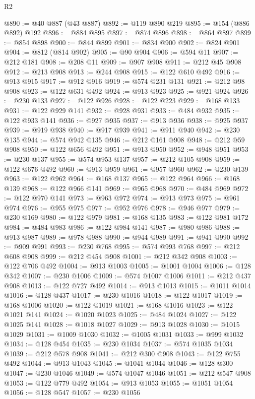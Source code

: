 \begin{lexlean}{R2}
\begin{coremodule}
@890 := @40 @887 (@43 @887)
@892 := @119 @890 @219
@895 := @154 (@886 @892) @192
@896 := @884 @895
@897 := @874 @896
@898 := @864 @897
@899 := @854 @898
@900 := @844 @899
@901 := @834 @900
@902 := @824 @901
@904 := @812 (@814 @902)
@905 := @90 @904
@906 := @594 @11
@907 := @212 @181
@908 := @208 @11
@909 := @907 @908
@911 := @212 @45 @908
@912 := @213 @908
@913 := @244 @908
@915 := @122 @610 @492
@916 := @913 @915
@917 := @912 @916
@919 := @574 @231 @131
@921 := @212 @98 @908
@923 := @122 @631 @492
@924 := @913 @923
@925 := @921 @924
@926 := @230 @133
@927 := @122 @926
@928 := @122 @223
@929 := @168 @133
@931 := @122 @929 @141
@932 := @928 @931
@933 := @484 @932
@935 := @122 @933 @141
@936 := @927 @935
@937 := @913 @936
@938 := @925 @937
@939 := @919 @938
@940 := @917 @939
@941 := @911 @940
@942 := @230 @135
@944 := @574 @942 @135
@946 := @212 @161 @908
@948 := @212 @59 @908
@950 := @122 @656 @492
@951 := @913 @950
@952 := @948 @951
@953 := @230 @137
@955 := @574 @953 @137
@957 := @212 @105 @908
@959 := @122 @676 @492
@960 := @913 @959
@961 := @957 @960
@962 := @230 @139
@963 := @122 @962
@964 := @168 @137
@965 := @122 @964
@966 := @168 @139
@968 := @122 @966 @141
@969 := @965 @968
@970 := @484 @969
@972 := @122 @970 @141
@973 := @963 @972
@974 := @913 @973
@975 := @961 @974
@976 := @955 @975
@977 := @952 @976
@978 := @946 @977
@979 := @230 @169
@980 := @122 @979
@981 := @168 @135
@983 := @122 @981 @172
@984 := @484 @983
@986 := @122 @984 @141
@987 := @980 @986
@988 := @913 @987
@989 := @978 @988
@990 := @944 @989
@991 := @941 @990
@992 := @909 @991
@993 := @230 @768
@995 := @574 @993 @768
@997 := @212 @608 @908
@999 := @212 @454 @908
@1001 := @212 @342 @908
@1003 := @122 @706 @492
@1004 := @913 @1003
@1005 := @1001 @1004
@1006 := @128 @342
@1007 := @230 @1006
@1009 := @574 @1007 @1006
@1011 := @212 @437 @908
@1013 := @122 @727 @492
@1014 := @913 @1013
@1015 := @1011 @1014
@1016 := @128 @437
@1017 := @230 @1016
@1018 := @122 @1017
@1019 := @168 @1006
@1020 := @122 @1019
@1021 := @168 @1016
@1023 := @122 @1021 @141
@1024 := @1020 @1023
@1025 := @484 @1024
@1027 := @122 @1025 @141
@1028 := @1018 @1027
@1029 := @913 @1028
@1030 := @1015 @1029
@1031 := @1009 @1030
@1032 := @1005 @1031
@1033 := @999 @1032
@1034 := @128 @454
@1035 := @230 @1034
@1037 := @574 @1035 @1034
@1039 := @212 @578 @908
@1041 := @212 @300 @908
@1043 := @122 @755 @492
@1044 := @913 @1043
@1045 := @1041 @1044
@1046 := @128 @300
@1047 := @230 @1046
@1049 := @574 @1047 @1046
@1051 := @212 @547 @908
@1053 := @122 @779 @492
@1054 := @913 @1053
@1055 := @1051 @1054
@1056 := @128 @547
@1057 := @230 @1056

\end{coremodule}
\end{lexlean}
